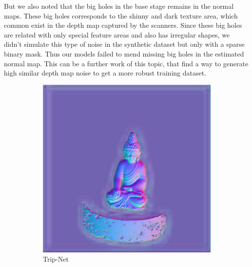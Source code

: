 But we also noted that the big holes in the base stage remains in the normal maps. These big holes corresponds to the shinny and dark texture area, which common exist in the depth map captured by the scanners. Since these big holes are related with only special feature areas and also has irregular shapes, we didn't simulate this type of noise in the synthetic dataset but only with a sparse binary mask. Thus our models failed to mend missing big holes in the estimated normal map. This can be a further work of this topic, that find a way to generate high similar depth map noise to get a more robust training dataset. 


\begin{figure}[th]
	\centering
	\begin{subfigure}[b]{0.30\linewidth}
		\includegraphics[width=\linewidth]{./Figures/comparison_real/fancy_eval_20_normal_An2-real-resume-616.png}
		\caption{Trip-Net}
	\end{subfigure}
	\begin{subfigure}[b]{0.30\linewidth}

\end{subfigure}
\end{figure}
